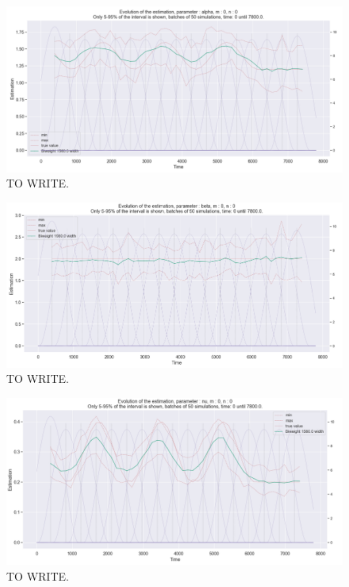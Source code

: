 \begin{figure}
\centering
\includegraphics[width = 0.90 \textwidth]{../imag/chap3/4/Figure_2.png}
\caption{TO WRITE.}
\label{fig:first_estimate_4_alpha}
\end{figure}

\begin{figure}
\centering
\includegraphics[width = 0.90 \textwidth]{../imag/chap3/4/Figure_3.png}
\caption{TO WRITE.}
\label{fig:first_estimate_4_beta}
\end{figure}

\begin{figure}
\centering
\includegraphics[width = 0.90 \textwidth]{../imag/chap3/4/Figure_4.png}
\caption{TO WRITE.}
\label{fig:first_estimate_4_nu}
\end{figure}






































